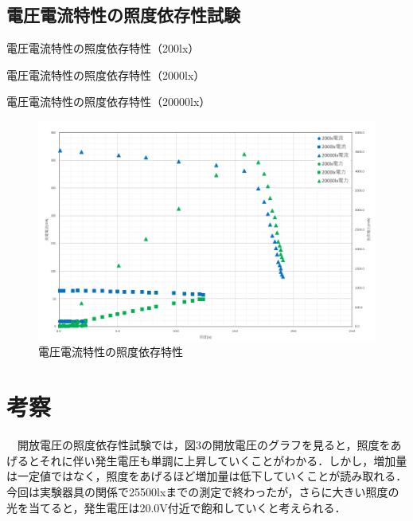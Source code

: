 \subsection{電圧電流特性の照度依存性試験}
\begin{table}[H]
  \small
  \centering
  \caption{電圧電流特性の照度依存特性（200lx）}
  
\end{table}

\begin{table}[H]
  \small
  \centering
  \caption{電圧電流特性の照度依存特性（2000lx）}
  
\end{table}

\begin{table}[H]
  \small
  \centering
  \caption{電圧電流特性の照度依存特性（20000lx）}
  
\end{table}

\begin{figure}[H]
  \centering
  \includegraphics[width=15cm]{./fig/fig05.png}
  \caption{電圧電流特性の照度依存特性}
\end{figure}

\newpage
\section{考察}
　開放電圧の照度依存性試験では，図3の開放電圧のグラフを見ると，照度をあげるとそれに伴い発生電圧も単調に上昇していくことがわかる．しかし，増加量は一定値ではなく，照度をあげるほど増加量は低下していくことが読み取れる．今回は実験器具の関係で25500lxまでの測定で終わったが，さらに大きい照度の光を当てると，発生電圧は20.0V付近で飽和していくと考えられる．\\

